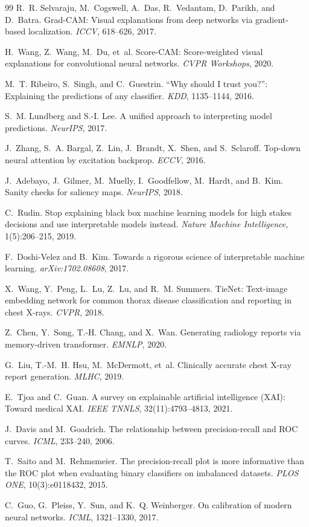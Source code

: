 \documentclass[10pt,twocolumn]{article}
\begin{document}
\begin{thebibliography}{99}
R.~R. Selvaraju, M.~Cogswell, A.~Das, R.~Vedantam, D.~Parikh, and D.~Batra.
Grad-CAM: Visual explanations from deep networks via gradient-based localization.
\emph{ICCV}, 618--626, 2017.

H.~Wang, Z.~Wang, M.~Du, et~al.
Score-CAM: Score-weighted visual explanations for convolutional neural networks.
\emph{CVPR Workshops}, 2020.

M.~T. Ribeiro, S.~Singh, and C.~Guestrin.
``Why should I trust you?'': Explaining the predictions of any classifier.
\emph{KDD}, 1135--1144, 2016.

S.~M. Lundberg and S.-I. Lee.
A unified approach to interpreting model predictions. \emph{NeurIPS}, 2017.

J.~Zhang, S.~A. Bargal, Z.~Lin, J.~Brandt, X.~Shen, and S.~Sclaroff.
Top-down neural attention by excitation backprop. \emph{ECCV}, 2016.

J.~Adebayo, J.~Gilmer, M.~Muelly, I.~Goodfellow, M.~Hardt, and B.~Kim.
Sanity checks for saliency maps. \emph{NeurIPS}, 2018.

C.~Rudin.
Stop explaining black box machine learning models for high stakes decisions and
use interpretable models instead. \emph{Nature Machine Intelligence},
1(5):206--215, 2019.

F.~Doshi-Velez and B.~Kim.
Towards a rigorous science of interpretable machine learning.
\emph{arXiv:1702.08608}, 2017.

X.~Wang, Y.~Peng, L.~Lu, Z.~Lu, and R.~M. Summers.
TieNet: Text-image embedding network for common thorax disease classification and
reporting in chest X-rays. \emph{CVPR}, 2018.

Z.~Chen, Y.~Song, T.-H. Chang, and X.~Wan.
Generating radiology reports via memory-driven transformer. \emph{EMNLP}, 2020.

G.~Liu, T.-M.~H. Hsu, M.~McDermott, et~al.
Clinically accurate chest X-ray report generation. \emph{MLHC}, 2019.

E.~Tjoa and C.~Guan.
A survey on explainable artificial intelligence (XAI): Toward medical XAI.
\emph{IEEE TNNLS}, 32(11):4793--4813, 2021.

J.~Davis and M.~Goadrich.
The relationship between precision-recall and ROC curves. \emph{ICML},
233--240, 2006.

T.~Saito and M.~Rehmsmeier.
The precision-recall plot is more informative than the ROC plot when evaluating
binary classifiers on imbalanced datasets. \emph{PLOS ONE}, 10(3):e0118432, 2015.

C.~Guo, G.~Pleiss, Y.~Sun, and K.~Q. Weinberger.
On calibration of modern neural networks. \emph{ICML}, 1321--1330, 2017.

\end{thebibliography}
\end{document}
